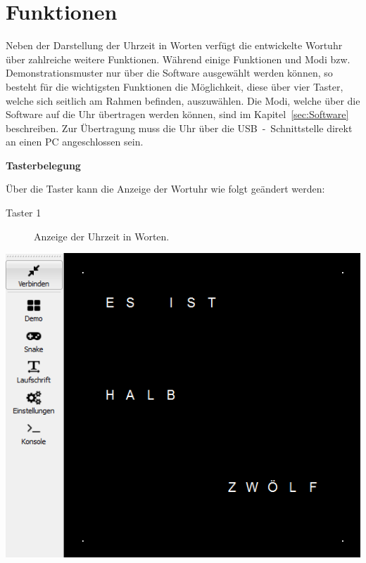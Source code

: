 
\section{Funktionen}
\label{sec:Funktionen}

\begin{multicols}{2}

Neben der Darstellung der Uhrzeit in Worten verfügt die entwickelte Wortuhr über zahlreiche weitere Funktionen. Während einige Funktionen und Modi bzw. Demonstrationsmuster nur über die Software ausgewählt werden können, so besteht für die wichtigsten Funktionen die Möglichkeit, diese über vier Taster, welche sich seitlich am Rahmen befinden, auszuwählen. Die Modi, welche über die Software auf die Uhr übertragen werden können, sind im Kapitel~\ref{sec:Software} beschreiben. Zur Übertragung muss die Uhr über die USB~-~Schnittstelle direkt an einen PC angeschlossen sein. 

 \textbf{Tasterbelegung}
 
 Über die Taster kann die Anzeige der Wortuhr wie folgt geändert werden:
\begin{description}
\item[Taster 1] Anzeige der Uhrzeit in Worten.
\end {description}
{
\centering\includegraphics[width=0.8\columnwidth]{Abbildungen/Funktionen/Uhrzeit_01}

}


\end{multicols}
